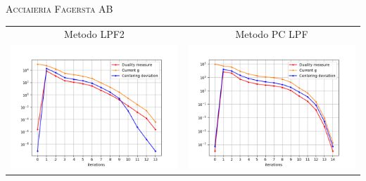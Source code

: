 
\begin{frame}{\textsc{\LARGE \textcolor{iris}{Acciaieria Fagersta AB}}}
	\centering
	\begin{tabular}{c@{}c}
		\small{Metodo LPF2} & \small{Metodo PC LPF} \\
		\includegraphics[scale = 0.33]{swe_LPF2}
		&\includegraphics[scale = 0.33]{swe_PCLPF}\\ 
	\end{tabular}
\end{frame}


